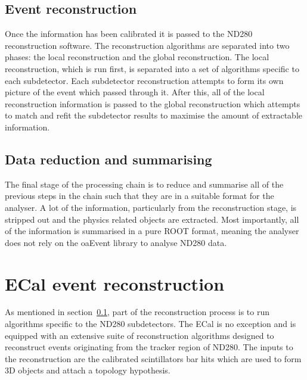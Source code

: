 \subsection{Event reconstruction}
\label{subsec:EventReconstruction}
Once the information has been calibrated it is passed to the ND280 reconstruction software.  The reconstruction algorithms are separated into two phases: the local reconstruction and the global reconstruction.  The local reconstruction, which is run first, is separated into a set of algorithms specific to each subdetector.  Each subdetector reconstruction attempts to form its own picture of the event which passed through it.  After this, all of the local reconstruction information is passed to the global reconstruction which attempts to match and refit the subdetector results to maximise the amount of extractable information.

\subsection{Data reduction and summarising}
\label{subsec:DataReduction}
The final stage of the processing chain is to reduce and summarise all of the previous steps in the chain such that they are in a suitable format for the analyser.  A lot of the information, particularly from the reconstruction stage, is stripped out and the physics related objects are extracted.  Most importantly, all of the information is summarised in a pure ROOT format, meaning the analyser does not rely on the oaEvent library to analyse ND280 data.


\section{ECal event reconstruction}
\label{sec:ECalEventReconstruction}
As mentioned in section~\ref{subsec:EventReconstruction}, part of the reconstruction process is to run algorithms specific to the ND280 subdetectors.  The ECal is no exception and is equipped with an extensive suite of reconstruction algorithms designed to reconstruct events originating from the tracker region of ND280.  The inputs to the reconstruction are the calibrated scintillators bar hits which are used to form 3D objects and attach a topology hypothesis.

